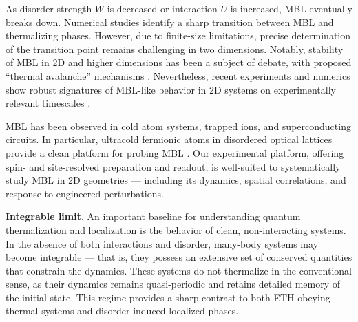 




As disorder strength $W$ is decreased or interaction $U$ is increased, MBL eventually breaks down. Numerical studies identify a sharp transition between MBL and thermalizing phases. 
However, due to finite-size limitations, precise determination of the transition point remains challenging in two dimensions. Notably, stability of MBL in 2D and higher dimensions has been a subject of debate, with proposed “thermal avalanche” mechanisms \cite{de_roeck_stability_2017}. Nevertheless, recent experiments and numerics show robust signatures of MBL-like behavior in 2D systems on experimentally relevant timescales \cite{choi_exploring_2016,bordia_probing_2017,wahl_signatures_2019}.

MBL has been observed in cold atom systems, trapped ions, and superconducting circuits. In particular, ultracold fermionic atoms in disordered optical lattices provide a clean platform for probing MBL \cite{schreiber_observation_2015,kondov_disorder-induced_2015,choi_exploring_2016}. Our experimental platform, offering spin- and site-resolved preparation and readout, is well-suited to systematically study MBL in 2D geometries — including its dynamics, spatial correlations, and response to engineered perturbations.





\textbf{Integrable limit}.
An important baseline for understanding quantum thermalization and localization is the behavior of clean, non-interacting systems. In the absence of both interactions and disorder, many-body systems may become integrable — that is, they possess an extensive set of conserved quantities that constrain the dynamics. These systems do not thermalize in the conventional sense, as their dynamics remains quasi-periodic and retains detailed memory of the initial state. This regime provides a sharp contrast to both ETH-obeying thermal systems and disorder-induced localized phases.

